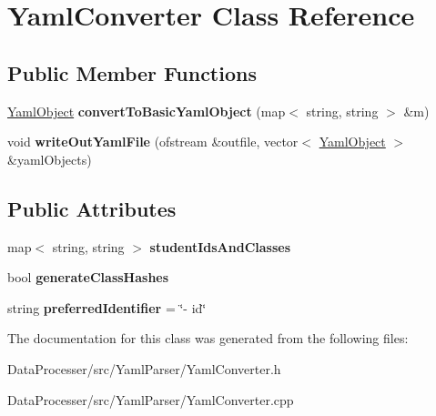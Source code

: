 \hypertarget{classYamlConverter}{}\section{Yaml\+Converter Class Reference}
\label{classYamlConverter}
\subsection*{Public Member Functions}
\begin{DoxyCompactItemize}
\item 
\mbox{\label{classYamlConverter_a539a4790a7227479dbfc3944d94a6edd}} 
\hyperlink{classYamlObject}{Yaml\+Object} {\bfseries convert\+To\+Basic\+Yaml\+Object} (map$<$ string, string $>$ \&m)
\item 
\mbox{\label{classYamlConverter_a020f8eb800db869cfaeaffa3db614a10}} 
void {\bfseries write\+Out\+Yaml\+File} (ofstream \&outfile, vector$<$ \hyperlink{classYamlObject}{Yaml\+Object} $>$ \&yaml\+Objects)
\end{DoxyCompactItemize}
\subsection*{Public Attributes}
\begin{DoxyCompactItemize}
\item 
\mbox{\label{classYamlConverter_a0bc3fc92e026b21d4d76e67b01ab3ede}} 
map$<$ string, string $>$ {\bfseries student\+Ids\+And\+Classes}
\item 
\mbox{\label{classYamlConverter_a8f5c802ccb018d8a8e52822a187e7250}} 
bool {\bfseries generate\+Class\+Hashes}
\item 
\mbox{\label{classYamlConverter_ab80f68315a81984cc7220b730f413931}} 
string {\bfseries preferred\+Identifier} = \char`\"{}-\/ id\char`\"{}
\end{DoxyCompactItemize}


The documentation for this class was generated from the following files\+:\begin{DoxyCompactItemize}
\item 
Data\+Processer/src/\+Yaml\+Parser/Yaml\+Converter.\+h\item 
Data\+Processer/src/\+Yaml\+Parser/Yaml\+Converter.\+cpp\end{DoxyCompactItemize}
